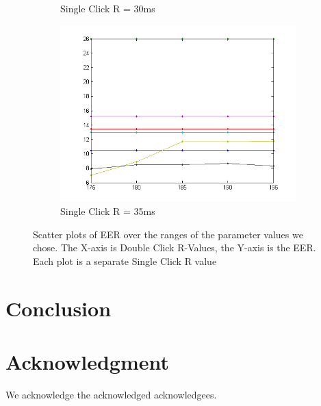 \documentclass[conference]{IEEEtran}
\begin{document}
\begin{figure}[]
\begin{subfigure}{.5\textwidth}
  \caption{Single Click R = 30ms}
  \label{fig:sfig3}
\end{subfigure}%
\begin{subfigure}{.5\textwidth}
  \centering
  \includegraphics[width=.8\linewidth]{s35}
  \caption{Single Click R = 35ms}
  \label{fig:sfig4}
\end{subfigure}
\caption{Scatter plots of EER over the ranges of the parameter values we chose. The X-axis is Double Click R-Values, the Y-axis is the EER. Each plot is a separate Single Click R value }
\label{fig:fig}
\end{figure}


\section{Conclusion}

\section*{Acknowledgment}
We acknowledge the acknowledged acknowledgees.


\end{document}
